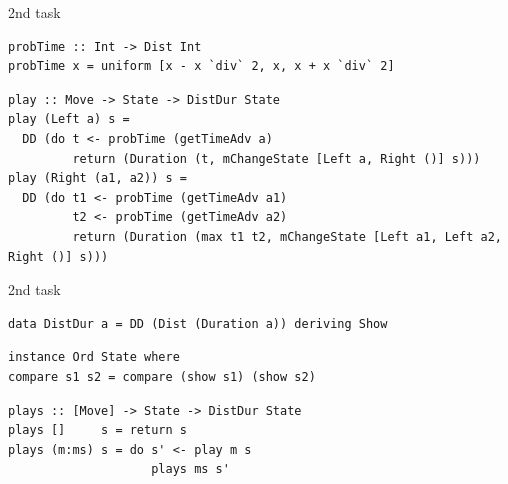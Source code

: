 \documentclass[aspectratio=169]{beamer}
\begin{document}
\begin{frame}[fragile]{2nd task}

\begin{verbatim}
probTime :: Int -> Dist Int
probTime x = uniform [x - x `div` 2, x, x + x `div` 2]
\end{verbatim}

\begin{verbatim}
play :: Move -> State -> DistDur State
play (Left a) s =
  DD (do t <- probTime (getTimeAdv a)
         return (Duration (t, mChangeState [Left a, Right ()] s)))
play (Right (a1, a2)) s =
  DD (do t1 <- probTime (getTimeAdv a1)
         t2 <- probTime (getTimeAdv a2)
         return (Duration (max t1 t2, mChangeState [Left a1, Left a2, Right ()] s)))
\end{verbatim}
\end{frame}

\begin{frame}[fragile]{2nd task}
\begin{verbatim}
data DistDur a = DD (Dist (Duration a)) deriving Show
\end{verbatim}

\begin{verbatim}
instance Ord State where
compare s1 s2 = compare (show s1) (show s2)
\end{verbatim}

\begin{verbatim}
plays :: [Move] -> State -> DistDur State 
plays []     s = return s
plays (m:ms) s = do s' <- play m s
                    plays ms s'
\end{verbatim}
\end{frame}
\end{document}
